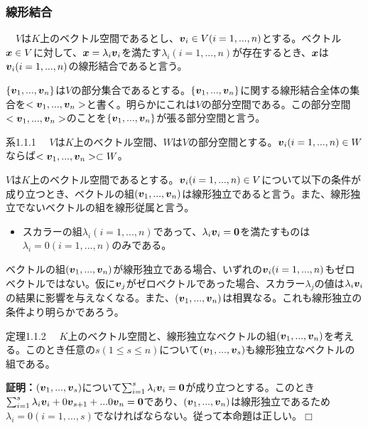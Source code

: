 \documentclass[dvipdfmx, 9pt, a4paper]{jsarticle}
\numberwithin{equation}{subsection}
\newcommand{\bm}[1]{{\mbox{\boldmath $#1$}}}
\def\qed{\hfill $\Box$}
\begin{document}
\subsubsection{線形結合}
\begin{tcolorbox}[title=線形結合]
　$V$は$K$上のベクトル空間であるとし、$\bm v_i \in V(i=1, ..., n)$とする。ベクトル$\bm x \in V$に対して、$\bm x=\lambda_i \bm v_i$を満たす$\lambda_i(i=1, ..., n)$が存在するとき、$\bm x$は$\bm v_i(i=1, ..., n)$の線形結合であると言う。
\end{tcolorbox}\par
$\{ \bm v_1, ..., \bm v_n\}$は$V$の部分集合であるとする。$\{ \bm v_1, ..., \bm v_n\}$に関する線形結合全体の集合を$<\bm v_1, ..., \bm v_n>$と書く。明らかにこれは$V$の部分空間である。この部分空間$<\bm v_1, ..., \bm v_n>$のことを$\{ \bm v_1, ..., \bm v_n\}$が張る部分空間と言う。
\begin{itembox}[l]{系1.1.1}
　$V$は$K$上のベクトル空間、$W$は$V$の部分空間とする。$\bm v_i(i=1, ..., n) \in W$ならば$<\bm v_1, ..., \bm v_n> \subset W$。
\end{itembox}
\begin{tcolorbox}[title=線形独立と線形従属]
$V$は$K$上のベクトル空間であるとする。$\bm v_i(i=1, ..., n) \in V$について以下の条件が成り立つとき、ベクトルの組$(\bm v_1, ..., \bm v_n)$は線形独立であると言う。また、線形独立でないベクトルの組を線形従属と言う。
\begin{itemize}
\item スカラーの組$\lambda_i(i=1, ..., n)$であって、$\lambda_i \bm v_i=\bm 0$を満たすものは$\lambda_i=0(i=1, ..., n)$のみである。
\end{itemize}
\end{tcolorbox}\par
ベクトルの組$(\bm v_1, ..., \bm v_n)$が線形独立である場合、いずれの$\bm v_i(i=1, ..., n)$もゼロベクトルではない。仮に$\bm v_j$がゼロベクトルであった場合、スカラー$\lambda_j$の値は$\lambda_i\bm v_i$の結果に影響を与えなくなる。また、$(\bm v_1, ..., \bm v_n)$は相異なる。これも線形独立の条件より明らかであろう。
\begin{itembox}[l]{定理1.1.2}
　$K$上のベクトル空間と、線形独立なベクトルの組$(\bm v_1, ..., \bm v_n)$を考える。このとき任意の$s(1\leq s \leq n)$について$(\bm v_1, ..., \bm v_s)$も線形独立なベクトルの組である。
\end{itembox}
{\bf 証明：}$(\bm v_1, ..., \bm v_s)$について$\sum_{i=1}^s \lambda_i\bm v_i=\bm 0$が成り立つとする。このとき$\sum_{i=1}^s\lambda_i\bm v_i + 0\bm v_{s+1}+...0\bm v_n=\bm 0$であり、$(\bm v_1, ..., \bm v_n)$は線形独立であるため$\lambda_i=0(i=1, ..., s)$でなければならない。従って本命題は正しい。\qed
\end{document}
